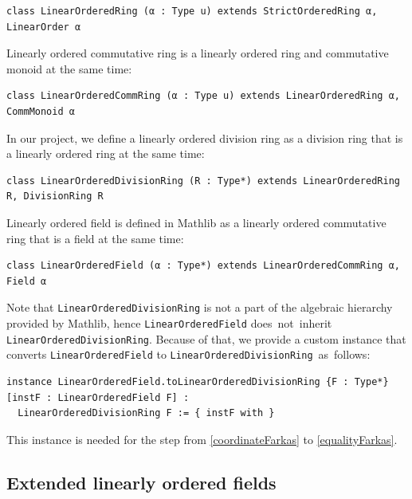 \documentclass[]{article}
\renewcommand{\.}{\hskip .75pt}
\begin{document}
\begin{lstlisting}
class LinearOrderedRing (α : Type u) extends StrictOrderedRing α, LinearOrder α
\end{lstlisting}
Linearly ordered commutative ring is a linearly ordered ring and commutative monoid at the same time:
\begin{lstlisting}
class LinearOrderedCommRing (α : Type u) extends LinearOrderedRing α, CommMonoid α
\end{lstlisting}
In our project, we define a linearly ordered division ring as a division ring that is a linearly ordered ring at the same time:
\begin{lstlisting}
class LinearOrderedDivisionRing (R : Type*) extends LinearOrderedRing R, DivisionRing R
\end{lstlisting}
Linearly ordered field is defined in Mathlib as a linearly ordered commutative ring that is a field at the same time:
\begin{lstlisting}
class LinearOrderedField (α : Type*) extends LinearOrderedCommRing α, Field α
\end{lstlisting}
Note that \texttt{LinearOrderedDivisionRing} is not a part of the algebraic hierarchy provided by Mathlib,
hence \texttt{LinearOrderedField} does~not~inherit \texttt{LinearOrderedDivisionRing}. 
Because of that, we provide a custom instance that converts
\texttt{LinearOrderedField} to \texttt{LinearOrderedDivisionRing}~as~follows:
\begin{lstlisting}
instance LinearOrderedField.toLinearOrderedDivisionRing {F : Type*} [instF : LinearOrderedField F] :
  LinearOrderedDivisionRing F := { instF with }
\end{lstlisting}
This instance is needed for the step from \ref{coordinateFarkas} to \ref{equalityFarkas}.

\subsection{Extended linearly ordered fields}
\end{document}
